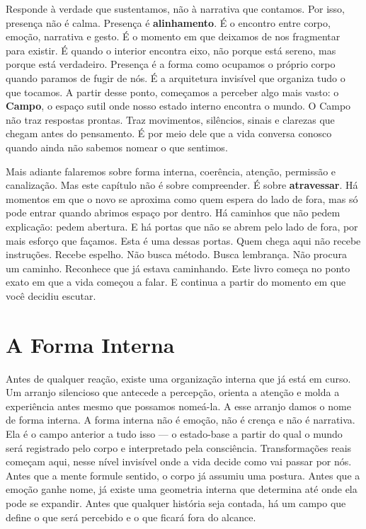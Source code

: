 \documentclass[12pt]{book}
\begin{document}
Responde à verdade que sustentamos, não à narrativa que contamos. Por isso, presença não é calma. Presença é \textbf{alinhamento}. É o encontro entre corpo, emoção, narrativa e gesto. É o momento em que deixamos de nos fragmentar para existir. É quando o interior encontra eixo, não porque está sereno, mas porque está verdadeiro. Presença é a forma como ocupamos o próprio corpo quando paramos de fugir de nós. É a arquitetura invisível que organiza tudo o que tocamos. A partir desse ponto, começamos a perceber algo mais vasto: o \textbf{Campo}, o espaço sutil onde nosso estado interno encontra o mundo. O Campo não traz respostas prontas. Traz movimentos, silêncios, sinais e clarezas que chegam antes do pensamento. É por meio dele que a vida conversa conosco quando ainda não sabemos nomear o que sentimos.

Mais adiante falaremos sobre forma interna, coerência, atenção, permissão e canalização. Mas este capítulo não é sobre compreender. É sobre \textbf{atravessar}. Há momentos em que o novo se aproxima como quem espera do lado de fora, mas só pode entrar quando abrimos espaço por dentro. Há caminhos que não pedem explicação: pedem abertura. E há portas que não se abrem pelo lado de fora, por mais esforço que façamos. Esta é uma dessas portas. Quem chega aqui não recebe instruções. Recebe espelho. Não busca método. Busca lembrança. Não procura um caminho. Reconhece que já estava caminhando. Este livro começa no ponto exato em que a vida começou a falar. E continua a partir do momento em que você decidiu escutar.

\chapter{A Forma Interna}

Antes de qualquer reação, existe uma organização interna que já está em curso. Um arranjo silencioso que antecede a percepção, orienta a atenção e molda a experiência antes mesmo que possamos nomeá-la. A esse arranjo damos o nome de forma interna. A forma interna não é emoção, não é crença e não é narrativa. Ela é o campo anterior a tudo isso --- o estado-base a partir do qual o mundo será registrado pelo corpo e interpretado pela consciência. Transformações reais começam aqui, nesse nível invisível onde a vida decide como vai passar por nós. Antes que a mente formule sentido, o corpo já assumiu uma postura. Antes que a emoção ganhe nome, já existe uma geometria interna que determina até onde ela pode se expandir. Antes que qualquer história seja contada, há um campo que define o que será percebido e o que ficará fora do alcance.
\end{document}
